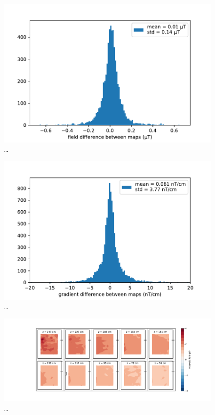 \begin{figure}
  \centering
  \includegraphics[width=0.8\linewidth]{gfx/mapping/lpsc/reproducibility_field.pdf}
  \caption{\ldots}
  \label{fig:mapping_bastille_magnitude}
\end{figure}

\begin{figure}
  \centering
  \includegraphics[width=0.8\linewidth]{gfx/mapping/lpsc/reproducibility_gradient.pdf}
  \caption{\ldots}
  \label{fig:mapping_bastille_magnitude}
\end{figure}

\begin{figure}
  \centering
  \includegraphics[width=\linewidth]{gfx/mapping/lpsc/bastille_crane_change_magnitude.pdf}
  \caption{\ldots}
  \label{fig:mapping_bastille_magnitude}
\end{figure}



